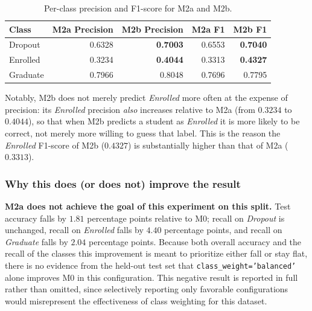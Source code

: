 \vspace{0.3cm}

\begin{table}[H]
\centering
\caption{Per-class precision and F1-score for M2a and M2b.}
\label{tab:f2-per-class}
\begin{tabular}{lrrrr}
\toprule
\textbf{Class} & \textbf{M2a Precision} & \textbf{M2b Precision} & \textbf{M2a F1} & \textbf{M2b F1} \\
\midrule
Dropout   & 0.6328 & \textbf{0.7003} & 0.6553 & \textbf{0.7040} \\
Enrolled  & 0.3234 & \textbf{0.4044} & 0.3313 & \textbf{0.4327} \\
Graduate  & 0.7966 & 0.8048 & 0.7696 & 0.7795 \\
\bottomrule
\end{tabular}
\end{table}

Notably, M2b does not merely predict \textit{Enrolled} more often at the expense of
precision: its \textit{Enrolled} precision \emph{also} increases relative to M2a
(from $0.3234$ to $0.4044$), so that when M2b predicts a student as
\textit{Enrolled} it is more likely to be correct, not merely more willing to
guess that label. This is the reason the \textit{Enrolled} F1-score of M2b
($0.4327$) is substantially higher than that of M2a ($0.3313$).

\subsubsection{Why this does (or does not) improve the result}
\label{sec:f2-discussion}

\textbf{M2a does not achieve the goal of this experiment on this split.} Test
accuracy falls by $1.81$ percentage points relative to M0; recall on
\textit{Dropout} is unchanged, recall on \textit{Enrolled} falls by $4.40$
percentage points, and recall on \textit{Graduate} falls by $2.04$ percentage
points. Because both overall accuracy and the recall of the classes this
improvement is meant to prioritize either fall or stay flat, there is no evidence
from the held-out test set that \texttt{class\_weight='balanced'} alone improves
M0 in this configuration. This negative result is reported in full rather than
omitted, since selectively reporting only favorable configurations would
misrepresent the effectiveness of class weighting for this dataset.

